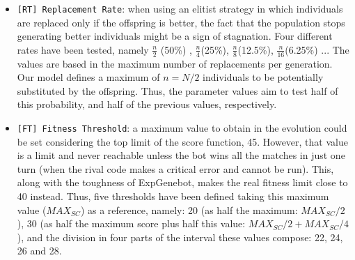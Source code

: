 \documentclass[runningheads,a4paper]{llncs}
\begin{document}
\begin{itemize}
    \item \texttt{[RT] Replacement Rate}: when using an elitist strategy in which individuals are replaced only if the offspring is better, the fact that the population stops generating better individuals might be a sign of stagnation. Four different rates have been tested, namely $\frac{n}{2}$ (50\%) , $\frac{n}{4}$(25\%), $\frac{n}{8}$(12.5\%), $\frac{n}{16}$(6.25\%) ... %
   The values are based in the maximum number of replacements per generation. Our model defines a maximum of $n = N/2$ individuals to be potentially substituted by the offspring. Thus, the parameter values aim to test half of this probability, and half of the previous values, respectively.


    \item \texttt{[FT] Fitness Threshold}: a maximum value to obtain in the evolution could be set considering the top limit of the score function, 45. However, that value is a limit and never reachable unless the bot wins all the matches in just one turn (when the rival code makes a critical error and cannot be run). This, along with the toughness of ExpGenebot, makes the real fitness limit close to 40 instead. Thus, five thresholds have been defined taking this maximum value ($MAX_{SC}$) as a reference, namely: 20 (as half the maximum: $MAX_{SC}/2$), 30 (as half the maximum score plus half this value: $MAX_{SC}/2 + MAX_{SC}/4$), and the division in four parts of the interval these values compose: 22, 24, 26 and 28.


\end{itemize}
\end{document}
